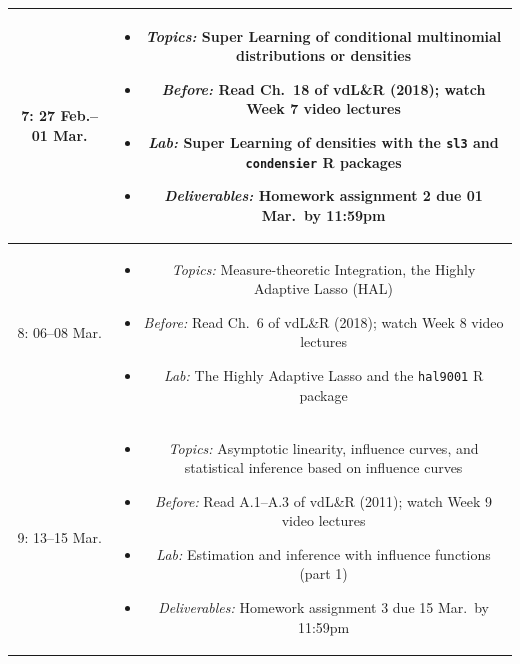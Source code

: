 \documentclass[11pt]{article}
\begin{document}
\begin{table}[H]
\begin{tabular}{ | c | c | }
7: 27 Feb.--01 Mar. & \begin{minipage}{.85\textwidth}
\begin{itemize} \itemsep-0.4em
  \vspace{1mm}
  \item \textit{Topics:} Super Learning of conditional multinomial distributions
    or densities
  \item \textit{Before:} Read Ch.~18 of vdL\&R (2018); watch Week 7 video
    lectures
  \item \textit{Lab:} Super Learning of densities with the \texttt{sl3} and
    \texttt{condensier} R packages
  \item \textit{Deliverables:} Homework assignment 2 due 01 Mar.~by 11:59pm
  \vspace{1mm}
\end{itemize}
\end{minipage} \\
\hline

8: 06--08 Mar. & \begin{minipage}{.85\textwidth}
\begin{itemize} \itemsep-0.4em
  \vspace{1mm}
  \item \textit{Topics:} Measure-theoretic Integration, the Highly Adaptive
    Lasso (HAL)
  \item \textit{Before:} Read Ch.~6 of vdL\&R (2018); watch Week 8 video lectures
  \item \textit{Lab:} The Highly Adaptive Lasso and the \texttt{hal9001} R
    package
  \vspace{1mm}
\end{itemize}
\end{minipage} \\
\hline

9: 13--15 Mar. & \begin{minipage}{.85\textwidth}
\begin{itemize} \itemsep-0.4em
  \vspace{1mm}
  \item \textit{Topics:} Asymptotic linearity, influence curves, and statistical
    inference based on influence curves
  \item \textit{Before:} Read A.1--A.3 of vdL\&R (2011); watch Week 9 video
    lectures
  \item \textit{Lab:} Estimation and inference with influence functions (part 1)
  \item \textit{Deliverables:} Homework assignment 3 due 15 Mar.~by 11:59pm
  \vspace{1mm}
\end{itemize}
\end{minipage} \\
\hline

\end{tabular}
\end{table}
\end{document}
